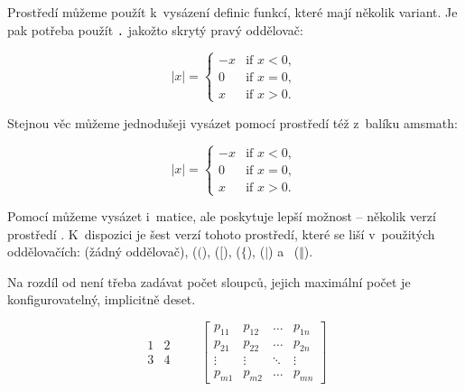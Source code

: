 Prostředí  můžeme použít k~vysázení definic funkcí, které
mají několik variant. Je pak potřeba použít \verb|.| jakožto
skrytý pravý oddělovač:
\begin{example}
\begin{equation*}
  |x| = \left\{
    \begin{array}{rl}
      -x & \text{if } x < 0,\\
       0 & \text{if } x = 0,\\
       x & \text{if } x > 0.
    \end{array} \right.
\end{equation*}
\end{example}
Stejnou věc můžeme jednodušeji vysázet pomocí prostředí 
 též z~balíku \textsf{amsmath}:
\begin{example}
  \begin{equation*}
    |x| = 
    \begin{cases}
      -x & \text{if } x < 0,\\
       0 & \text{if } x = 0,\\
       x & \text{if } x > 0.
    \end{cases} 
\end{equation*}
\end{example}

Pomocí  můžeme vysázet i~matice, ale
 poskytuje lepší možnost -- několik verzí prostředí
. K~dispozici je šest verzí tohoto prostředí, které se
liší v~použitých oddělovačích:  (žádný oddělovač),
 ($($),  ($[$),  ($\{$),
 ($\vert$) a~ ($\Vert$). 

Na rozdíl od 
není třeba zadávat počet sloupců, jejich maximální počet je
konfigurovatelný, implicitně deset.
\begin{example}
\begin{equation*}
  \begin{matrix} 
    1 & 2 \\
    3 & 4 
  \end{matrix} \qquad
  \begin{bmatrix} 
    p_{11} & p_{12} & \ldots 
    & p_{1n} \\
    p_{21} & p_{22} & \ldots 
    & p_{2n} \\
    \vdots & \vdots & \ddots 
    & \vdots \\
    p_{m1} & p_{m2} & \ldots 
    & p_{mn} 
  \end{bmatrix}
\end{equation*}
\end{example}



